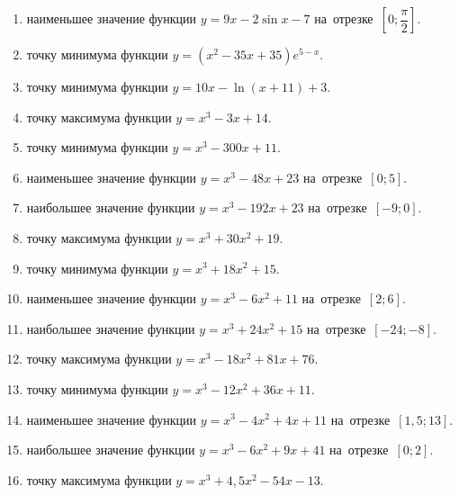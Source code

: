 \documentclass[a4paper,10pt]{article}
\begin{document}
\begin{enumerate}
\item {} наименьшее значение функции $y=9x-2\sin x -7$ на~отрезке~$\left[0;\dfrac{\pi }{2}\right]$.

\item {} точку минимума функции $y=\left(x^2-35x+35\right){{e}^{5-x}}$.

\item {} точку минимума функции $y=10x-\ln \left(x+11\right)+3$.

\item {} точку максимума функции $y=x^3 -3x +14$.

\item {} точку минимума функции $y=x^3 -300x+11$.

\item {} наименьшее значение функции $y=x^3 -48x+23$ на~отрезке~$\left[0;5\right]$.

\item {} наибольшее значение функции $y=x^3 -192x+23$ на~отрезке~$\left[-9;0\right]$.

\item {} точку максимума функции $y=x^3 +30x^2+19$.

\item {} точку минимума функции $y=x^3 +18x^2+15$.

\item {} наименьшее значение функции $y=x^3 -6x^2+11$ на~отрезке~$\left[2;6\right]$.

\item {} наибольшее значение функции $y=x^3 +24x^2+15$ на~отрезке~$\left[-24;-8\right]$.

\item {} точку максимума функции $y=x^3 -18x^2+81x+76$.

\item {} точку минимума функции $y=x^3 -12x^2+36x+11$.

\item {} наименьшее значение функции $y=x^3 -4x^2+4x+11$ на~отрезке~$\left[1,5;13\right]$.

\item {} наибольшее значение функции $y=x^3 -6x^2+9x+41$ на~отрезке~$\left[0;2\right]$.

\item {} точку максимума функции $y=x^3 +4,5x^2-54x-13$.


\end{enumerate}
\end{document}
